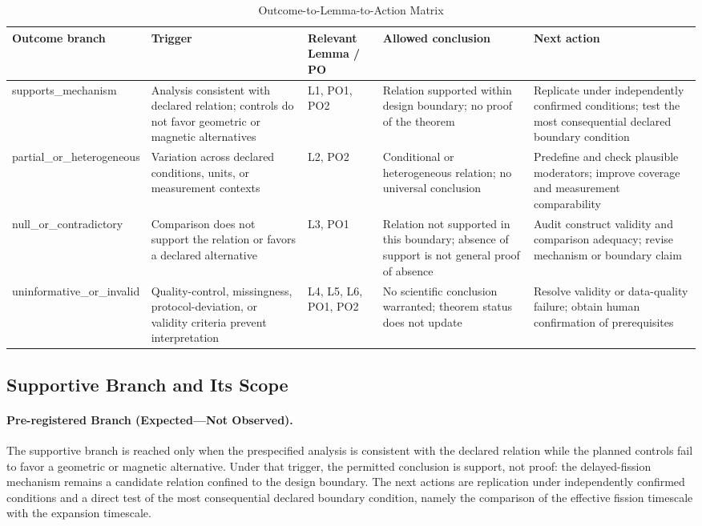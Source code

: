 \documentclass[conference]{IEEEtran}
\begin{document}
\begin{table}[htbp]
\centering
\footnotesize
\setlength{\tabcolsep}{3pt}
\renewcommand{\arraystretch}{1.12}
\caption{Outcome-to-Lemma-to-Action Matrix}
\label{tab:expected-outcomes-decision-matrix}
\begin{tabular}{|p{}|p{}|p{}|p{}|p{}|}
\hline
Outcome branch & Trigger & Relevant Lemma / PO & Allowed conclusion & Next action \\\hline
supports\_mechanism & Analysis consistent with declared relation; controls do not favor geometric or magnetic alternatives & L1, PO1, PO2 & Relation supported within design boundary; no proof of the theorem & Replicate under independently confirmed conditions; test the most consequential declared boundary condition \\\hline
partial\_or\_heterogeneous & Variation across declared conditions, units, or measurement contexts & L2, PO2 & Conditional or heterogeneous relation; no universal conclusion & Predefine and check plausible moderators; improve coverage and measurement comparability \\\hline
null\_or\_contradictory & Comparison does not support the relation or favors a declared alternative & L3, PO1 & Relation not supported in this boundary; absence of support is not general proof of absence & Audit construct validity and comparison adequacy; revise mechanism or boundary claim \\\hline
uninformative\_or\_invalid & Quality-control, missingness, protocol-deviation, or validity criteria prevent interpretation & L4, L5, L6, PO1, PO2 & No scientific conclusion warranted; theorem status does not update & Resolve validity or data-quality failure; obtain human confirmation of prerequisites \\\hline
\end{tabular}
\end{table}

\subsection{Supportive Branch and Its Scope}
\paragraph{Pre-registered Branch (Expected---Not Observed).} The supportive branch is reached only when the prespecified analysis is consistent with the declared relation while the planned controls fail to favor a geometric or magnetic alternative. Under that trigger, the permitted conclusion is support, not proof: the delayed-fission mechanism remains a candidate relation confined to the design boundary. The next actions are replication under independently confirmed conditions and a direct test of the most consequential declared boundary condition, namely the comparison of the effective fission timescale with the expansion timescale.
\end{document}
